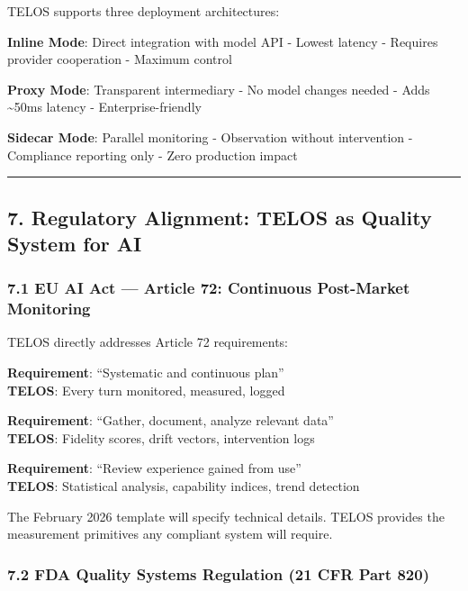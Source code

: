 TELOS supports three deployment architectures:

\textbf{Inline Mode}: Direct integration with model API - Lowest latency
- Requires provider cooperation - Maximum control

\textbf{Proxy Mode}: Transparent intermediary - No model changes needed
- Adds \textasciitilde50ms latency - Enterprise-friendly

\textbf{Sidecar Mode}: Parallel monitoring - Observation without
intervention - Compliance reporting only - Zero production impact

\begin{center}\rule{0.5\linewidth}{0.5pt}\end{center}

\subsection{7. Regulatory Alignment: TELOS as Quality System for
AI}\label{regulatory-alignment-telos-as-quality-system-for-ai}

\subsubsection{7.1 EU AI Act --- Article 72: Continuous Post-Market
Monitoring}\label{eu-ai-act-article-72-continuous-post-market-monitoring}

TELOS directly addresses Article 72 requirements:

\textbf{Requirement}: ``Systematic and continuous plan''\\
\textbf{TELOS}: Every turn monitored, measured, logged

\textbf{Requirement}: ``Gather, document, analyze relevant data''\\
\textbf{TELOS}: Fidelity scores, drift vectors, intervention logs

\textbf{Requirement}: ``Review experience gained from use''\\
\textbf{TELOS}: Statistical analysis, capability indices, trend
detection

The February 2026 template will specify technical details. TELOS
provides the measurement primitives any compliant system will require.

\subsubsection{7.2 FDA Quality Systems Regulation (21 CFR Part
820)}\label{fda-quality-systems-regulation-21-cfr-part-820}


